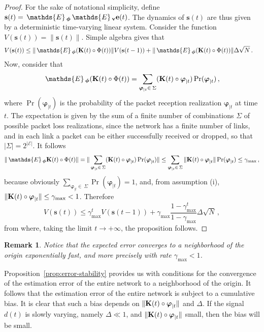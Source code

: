 \documentclass[a4paper,notitlepage,onecolumn]{article}
\def\K{{\cal K}}
\def\v{{\bf v}}
\def\K{{\bf K}}
\def\phib{\boldsymbol{\phi}}
\def\varphib{\boldsymbol{\varphi}}
\def\E{\,\mathds{E}\,}
\newtheorem{remark}[theorem]{Remark}
\numberwithin{equation}{section}
\begin{document}
\begin{proof}
For the sake of notational simplicity, define
$\mathbf{s}(t)=\E_{\phib} \E_\v \mathbf{e}(t)$. The dynamics of
$\mathbf{s}(t)$ are thus given by a deterministic time-varying linear
system. Consider the function
$V(\mathbf{s}(t))=\|\mathbf{s}(t)\|$. Simple algebra gives that
\begin{align*}
V(\mathbf{s}(t)) &\leq \|\E_{\phib} (\K(t) \circ \Phi(t))\|
V(\mathbf{s}(t-1)) + \|\E_{\phib} (\K(t) \circ \Phi(t))\| \Delta \sqrt{N} \,.
\end{align*}
Now, consider that
\begin{align*}
\E_{\phib} (\K(t) \circ \Phi(t)) = \sum_{\varphib_{|t} \in\: \Sigma} (\K(t) \circ \varphib_{|t}) \Pr(\varphib_{|t}) \,,
\end{align*}
where $\Pr(\varphib_{|t})$ is the probability of the packet reception realization $\varphib_{|t}$ at time $t$. The expectation is given by the sum of a finite number of combinations $\Sigma$ of possible packet loss realizations, since the network has a finite number of links, and in each link a packet can be either successfully received or dropped, so that $|\Sigma| = 2^{|\mathcal{E}|}$. It follows
\begin{align*}
\|\E_{\phib} \K(t) \circ \Phi(t) \| = \| \sum_{\varphib_{|t}\in\: \Sigma} (\K(t) \circ \varphib_{|t}) \Pr(\varphib_{|t}) \| \leq \sum_{\varphib_{|t}\in\: \Sigma} \|\K(t) \circ \varphib_{|t}\| \Pr(\varphib_{|t}) \leq \gamma_{\max}\,,
\end{align*}
because obviously $\sum_{\varphib_{|t}\in\: \Sigma}
\Pr(\varphib_{|t}) = 1$, and, from assumption (i), $\|\K(t) \circ
\varphib_{|t}\| \leq \gamma_{\max}<1$. Therefore
$$
    V(\mathbf{s}(t)) \leq \gamma_{\max}^t V(\mathbf{s}(t-1)) + \gamma_{\max}
    \frac{1-\gamma_{\max}^t}{1-\gamma_{\max}}\Delta\sqrt{N}\,,
$$
from where, taking the limit $t\rightarrow +\infty$, the proposition follows.
\end{proof}

\begin{remark}
Notice that the expected error converges to a neighborhood of the
origin exponentially fast, and more precisely with rate
$\gamma_{\max}<1$.
\end{remark}




Proposition~\ref{prop:error-stability} provides us with conditions
for the convergence of the estimation error of the entire network
to a neighborhood of the origin. It follows that the estimation
error of the entire network is subject to a cumulative bias. It is
clear that such a bias depends on $\|\K(t) \circ \varphib_{|t}\|$
and $\Delta$. If the signal $d(t)$ is slowly varying, namely
$\Delta\ll 1$, and $\|\K(t) \circ \varphib_{|t}\|$ small, then the
bias will be small.
\end{document}
